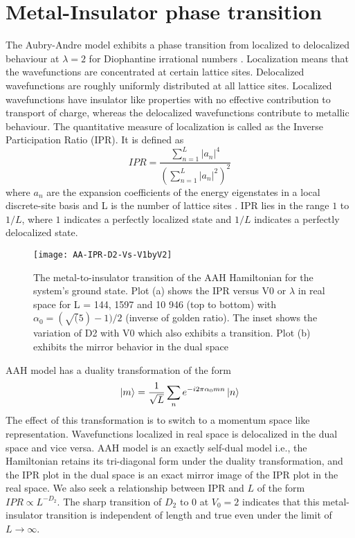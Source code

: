 \section{Metal-Insulator phase transition}
The Aubry-Andre model exhibits a phase transition from localized to delocalized behaviour at $\lambda = 2$ for Diophantine irrational numbers \cite{aulbach2004phase,aubry1980analyticity,jitomirskaya1999metal}. Localization means that the wavefunctions are concentrated at
certain lattice sites. Delocalized wavefunctions are roughly uniformly distributed at all lattice sites. Localized wavefunctions have insulator like properties with no effective
contribution to transport of charge, whereas the delocalized wavefunctions contribute to metallic behaviour. The quantitative measure of localization is called as the Inverse Participation Ratio (IPR).
It is defined as
\begin{equation}
 IPR = \frac{\sum_{n=1}^{L} |a_{n}|^4} {(\sum_{n=1}^{L} |a_{n}|^2)^2}
\end{equation} where $a_n$ are the expansion coefficients of the energy eigenstates in a local discrete-site basis and L is the number of lattice sites \cite{mishra2016phase, aulbach2004phase, aubry1980analyticity}.
IPR lies in the range $1$ to $1/L$, where $1$ indicates a perfectly localized state and $1/L$ indicates a perfectly delocalized state.

\begin{figure}[h]
\caption{ The metal-to-insulator transition of the
AAH Hamiltonian for the system’s ground state. Plot (a) shows the
IPR versus V0 or $\lambda$ in real space for L = 144, 1597 and 10 946 (top to
bottom) with $\alpha_0 = (\sqrt(5)-1)/2$ (inverse of golden ratio). The inset shows the variation of D2 with V0 which also
exhibits a transition. Plot (b) exhibits the mirror behavior in the dual
space}
\texttt{[image: AA-IPR-D2-Vs-V1byV2]}
\centering
\end{figure}
AAH model has a duality transformation of the form \cite{aubry1980analyticity,aulbach2004phase,mishra2016phase}
\begin{equation}
 \ket{m} = \frac{1}{\sqrt{L}}\sum_{n}e^{-i2\pi\alpha_0 m n} \ket{n}
\end{equation} The effect of this transformation is to switch to a momentum space like representation. Wavefunctions localized in real space is delocalized in the dual space and vice versa.
AAH model is an exactly self-dual model i.e., the Hamiltonian retains its tri-diagonal form under the duality transformation, and the IPR plot in the dual space is an
exact mirror image of the IPR plot in the real space.
We also seek a relationship between IPR and $L$ of the form $IPR \propto L^{-D_2}$. The sharp transition of $D_2$ to 0 at $V_0 = 2$ indicates that this metal-insulator transition
is independent of length and true even under the limit of $L \rightarrow \infty$.

